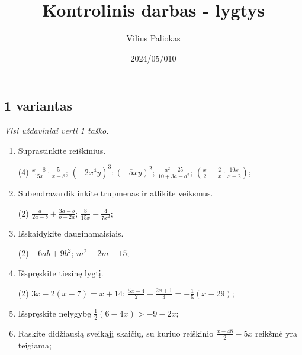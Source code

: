 \documentclass[a4paper]{article}
\title{Kontrolinis darbas - lygtys}
\author{Vilius Paliokas}
\date{2024/05/010}
\begin{document}
\thispagestyle{fancy}

\titlespacing*{\subsection}{0pt}{.75ex}{0.75ex}

\subsection*{1 variantas}

\textit{Visi uždaviniai verti 1 taško.}

\begin{enumerate}
      \item Suprastinkite reiškinius.
            \begin{tasks}[item-format={\normalfont}, after-item-skip=2mm](4)
                  \task $\frac{x-8}{15x}\cdot \frac{5}{x-8}$;
                  \task $(-2x^4y)^3:(-5xy)^2$;
                  \task $\frac{a^2-25}{10+3a-a^2}$;
                  \task $(\frac{x}{2}-\frac{2}{x}\cdot \frac{10x}{x-2})$;
            \end{tasks}

      \item Subendravardiklinkite trupmenas ir atlikite veiksmus.
            \begin{tasks}[item-format={\normalfont}, after-item-skip=2mm](2)
                  \task $\frac{a}{2a-b}+\frac{3a-b}{b-2a}$;
                  \task $\frac{8}{15x}-\frac{4}{7x^2}$;
            \end{tasks}

      \item Išskaidykite dauginamaisiais.
            \begin{tasks}[item-format={\normalfont}, after-item-skip=2mm](2)
                  \task $-6ab+9b^2$;
                  \task $m^2-2m-15$;
            \end{tasks}

      \item Išspręskite tiesinę lygtį.
            \begin{tasks}[item-format={\normalfont}, after-item-skip=2mm](2)
                  \task $3x-2(x-7)=x+14$;
                  \task $\frac{5x-4}{2}-\frac{2x+1}{3}=-\frac{1}{5}(x-29)$;
            \end{tasks}

      \item Išspręskite nelygybę $\frac{1}{2}(6-4x)>-9-2x$;
      \item Raskite didžiausią sveikąjį skaičių, su kuriuo reiškinio $\frac{x-48}{2}-5x$
            reikšmė yra teigiama;
\end{enumerate}
\end{document}

